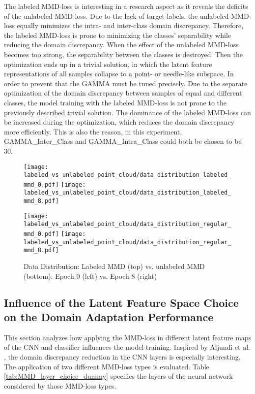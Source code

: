 The labeled MMD-loss is interesting in a research aspect as it reveals the deficits of the unlabeled MMD-loss. Due to the lack of target labels, the unlabeled MMD-loss equally minimizes the intra- and inter-class domain discrepancy. Therefore, the labeled MMD-loss is prone to minimizing the classes' separability while reducing the domain discrepancy. When the effect of the unlabeled MMD-loss becomes too strong, the separability between the classes is destroyed. Then the optimization ends up in a trivial solution, in which the latent feature representations of all samples collapse to a point- or needle-like subspace. In order to prevent that the GAMMA must be tuned precisely. Due to the separate optimization of the domain discrepancy between samples of equal and different classes, the model training with the labeled MMD-loss is not prone to the previously described trivial solution. The dominance of the labeled MMD-loss can be increased during the optimization, which reduces the domain discrepancy more efficiently. This is also the reason, in this experiment, GAMMA\_Inter\_Class and GAMMA\_Intra\_Class could both be chosen to be 30.


\begin{figure}[htp]
  \centering
  \texttt{[image: labeled\_vs\_unlabeled\_point\_cloud/data\_distribution\_labeled\_mmd\_0.pdf]}
  \hspace{.4cm}
  \texttt{[image: labeled\_vs\_unlabeled\_point\_cloud/data\_distribution\_labeled\_mmd\_8.pdf]}

  \vspace{.1cm}

  \texttt{[image: labeled\_vs\_unlabeled\_point\_cloud/data\_distribution\_regular\_mmd\_0.pdf]}
  \hspace{.4cm}
  \texttt{[image: labeled\_vs\_unlabeled\_point\_cloud/data\_distribution\_regular\_mmd\_8.pdf]}
  
  \caption{Data Distribution: Labeled MMD (top) vs. unlabeled MMD (bottom): Epoch 0 (left) vs. Epoch 8 (right)}
  \label{fig:point_cloud_labeled_unlabeled_mmd}
\end{figure}

\subsection{Influence of the Latent Feature Space Choice on the Domain Adaptation Performance}
\label{cnn_mmd_dummy}

This section analyzes how applying the MMD-loss in different latent feature maps of the CNN and classifier influences the model training. Inspired by Aljundi et al. \cite{Aljundi2016}, the domain discrepancy reduction in the CNN layers is especially interesting. The application of two different MMD-loss types is evaluated. Table \ref{tab:MMD_layer_choice_dummy} specifies the layers of the neural network considered by those MMD-loss types.

